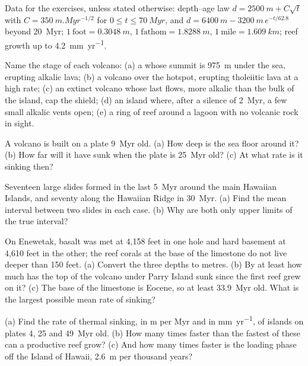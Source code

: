 Data for the exercises, unless stated otherwise: depth--age law $d = \qty{2500}{m} + C\sqrt t$ with
$C = \qty{350}{m.Myr^{-1/2}}$ for $0 \le t \le \qty{70}{Myr}$, and $d = \qty{6400}{m} -
\qty{3200}{m}\,e^{-t/62.8}$ beyond \qty{20}{Myr}; $1~\text{foot} = \qty{0.3048}{m}$, $1~\text{fathom}
= \qty{1.8288}{m}$, $1~\text{mile} = \qty{1.609}{km}$; reef growth up to \qty{4.2}{mm.yr^{-1}}.

\begin{exercise}[$\star$]\label{exo:b2:oceanic-islands:1}
Name the stage of each volcano: (a) a  whose summit is \qty{975}{m} under the sea, erupting
alkalic lava; (b) a volcano over the hotspot, erupting tholeiitic lava at a high rate; (c) an
extinct volcano whose last flows, more alkalic than the bulk of the island, cap the shield; (d) an
island where, after a silence of \qty{2}{Myr}, a few small alkalic vents open; (e) a ring of reef
around a lagoon with no volcanic rock in sight.
\end{exercise}

\begin{exercise}[$\star$]\label{exo:b2:oceanic-islands:2}
A volcano is built on a plate \qty{9}{Myr} old. (a) How deep is the sea floor around it? (b) How
far will it have sunk when the plate is \qty{25}{Myr} old? (c) At what rate is it sinking then?
\end{exercise}

\begin{exercise}[$\star$]\label{exo:b2:oceanic-islands:3}
Seventeen large slides formed in the last \qty{5}{Myr} around the main Hawaiian Islands, and
seventy along the Hawaiian Ridge in \qty{30}{Myr}. (a) Find the mean interval between two slides in
each case. (b) Why are both only upper limits of the true interval?
\end{exercise}

\begin{exercise}[$\star$]\label{exo:b2:oceanic-islands:4}
On Enewetak, basalt was met at 4,158 feet in one hole and hard basement at 4,610 feet in the
other; the reef corals at the base of the limestone do not live deeper than 150 feet. (a) Convert
the three depths to metres. (b) By at least how much has the top of the volcano under Parry Island
sunk since the first reef grew on it? (c) The base of the limestone is Eocene, so at least
\qty{33.9}{Myr} old. What is the largest possible mean rate of sinking?
\end{exercise}

\begin{exercise}[$\star\star$]\label{exo:b2:oceanic-islands:5}
(a) Find the rate of thermal sinking, in \unit{m} per \unit{Myr} and in \unit{mm.yr^{-1}}, of
islands on plates 4, 25 and \qty{49}{Myr} old. (b) How many times faster than the fastest of these
can a productive reef grow? (c) And how many times faster is the loading phase off the Island of
Hawaii, \qty{2.6}{m} per thousand years?
\end{exercise}

